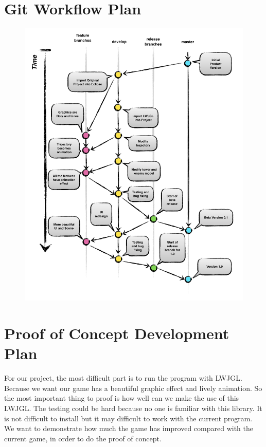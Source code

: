 \documentclass[12pt]{article}
\begin{document}
\section{Git Workflow Plan}
\begin{figure}
\centering
\includegraphics[width=16cm]{img/GitWorkflow.png}
\end{figure}
\newpage

\section{Proof of Concept Development Plan}
For our project, the most difficult part is to run the program with LWJGL. Because we want our game has a beautiful graphic effect and lively animation. So the most important thing to proof is how well can we make the use of this LWJGL. The testing could be hard because no one is familiar with this library. It is not difficult to install but it may difficult to work with the current program. We want to demonstrate how much the game has improved compared with the current game, in order to do the proof of concept.
\end{document}
